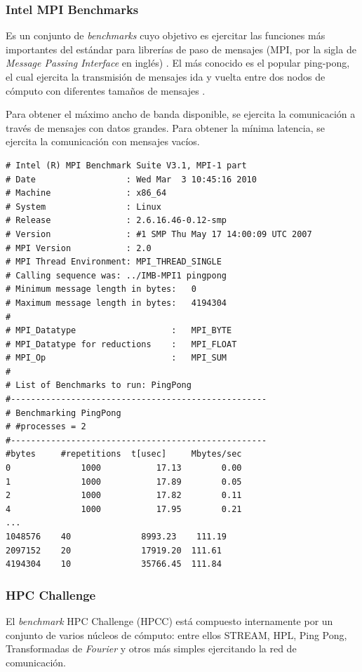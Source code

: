 \documentclass[a4paper]{report}
\begin{document}
\subsubsection{Intel MPI Benchmarks}

Es un conjunto de {\it benchmarks} cuyo objetivo es ejercitar las funciones más importantes del estándar para librerías de paso de mensajes
(MPI, por la sigla de {\it Message Passing Interface} en inglés) \cite{mpi-standard}.
El más conocido es el popular ping-pong, el cual ejercita la transmisión de mensajes ida y vuelta entre dos nodos de cómputo con diferentes tamaños de mensajes \cite{latency}.

\bigskip

Para obtener el máximo ancho de banda disponible, se ejercita la comunicación a través de mensajes con datos grandes. 
Para obtener la mínima latencia, se ejercita la comunicación con mensajes vacíos.

{\small
\begin{verbatim}
# Intel (R) MPI Benchmark Suite V3.1, MPI-1 part
# Date                  : Wed Mar  3 10:45:16 2010
# Machine               : x86_64
# System                : Linux
# Release               : 2.6.16.46-0.12-smp
# Version               : #1 SMP Thu May 17 14:00:09 UTC 2007
# MPI Version           : 2.0
# MPI Thread Environment: MPI_THREAD_SINGLE
# Calling sequence was: ../IMB-MPI1 pingpong
# Minimum message length in bytes:   0
# Maximum message length in bytes:   4194304
#
# MPI_Datatype                   :   MPI_BYTE
# MPI_Datatype for reductions    :   MPI_FLOAT
# MPI_Op                         :   MPI_SUM
#
# List of Benchmarks to run: PingPong
#---------------------------------------------------
# Benchmarking PingPong
# #processes = 2
#---------------------------------------------------
#bytes     #repetitions  t[usec]     Mbytes/sec
0              1000           17.13        0.00
1              1000           17.89        0.05
2              1000           17.82        0.11
4              1000           17.95        0.21
...
1048576    40              8993.23    111.19
2097152    20              17919.20  111.61
4194304    10              35766.45  111.84
\end{verbatim}
}

\subsubsection{HPC Challenge}

El {\it benchmark} HPC Challenge \cite{hpcc} (HPCC) está compuesto internamente por un conjunto de varios núcleos de cómputo: entre ellos STREAM, HPL, Ping Pong,
Transformadas de {\it Fourier} y otros más simples ejercitando la red de comunicación.
\end{document}
